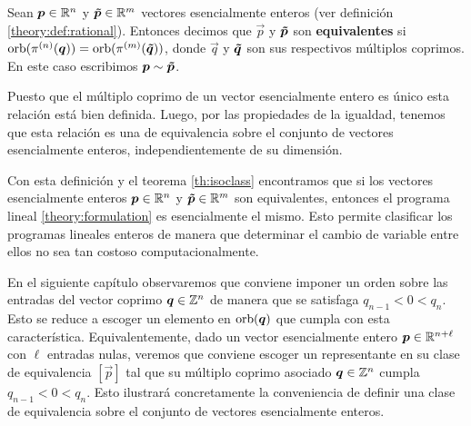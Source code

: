 \begin{definition}
	Sean $\boldsymbol{p} \in \mathbb{R}^n$ y $\boldsymbol{\tilde{p}} \in \mathbb{R}^m$ vectores esencialmente enteros
	(ver definición \ref{theory:def:rational}). Entonces decimos que $\vec{p}$ y $\boldsymbol{\tilde{p}}$ son
	\textbf{equivalentes} si $\operatorname{orb}(\pi^{(n)}(\boldsymbol{q})) = \operatorname{orb}(\pi^{(m)}(\boldsymbol{\tilde{q}}))$, donde $\vec{q}$ y
	$\boldsymbol{\tilde{q}}$ son sus respectivos múltiplos coprimos. En este caso escribimos $\boldsymbol{p} \sim
	\boldsymbol{\tilde{p}}$.
\end{definition}
Puesto que el múltiplo coprimo de un vector esencialmente entero es único esta relación está bien
definida. Luego, por las propiedades de la igualdad, tenemos que esta relación es una de
equivalencia sobre el conjunto de vectores esencialmente enteros, independientemente de su
dimensión.

Con esta definición y el teorema \ref{th:isoclass} encontramos que si los vectores esencialmente
enteros $\boldsymbol{p} \in \mathbb{R}^n$ y $\boldsymbol{\tilde{p}} \in \mathbb{R}^{m}$ son equivalentes, entonces el programa lineal
\eqref{theory:formulation} es esencialmente el mismo. Esto permite clasificar los programas lineales
enteros de manera que determinar el cambio de variable entre ellos no sea tan costoso computacionalmente.


En el siguiente capítulo observaremos que conviene imponer un orden sobre las entradas del vector
coprimo $\boldsymbol{q} \in \mathbb{Z}^n$ de manera que se satisfaga $q_{n - 1} < 0 < q_n$. Esto se reduce a escoger
un elemento en $\operatorname{orb}(\boldsymbol{q})$ que cumpla con esta característica. Equivalentemente, dado un vector
esencialmente entero $\boldsymbol{p} \in \mathbb{R}^{n + \ell}$ con $\ell$ entradas nulas, veremos que conviene
escoger un representante en su clase de equivalencia $[\vec{p}]$ tal que su múltiplo coprimo
asociado $\boldsymbol{q} \in \mathbb{Z}^n$ cumpla $q_{n-1} < 0 < q_n$. Esto ilustrará concretamente la
conveniencia de definir una clase de equivalencia sobre el conjunto de vectores esencialmente enteros.



